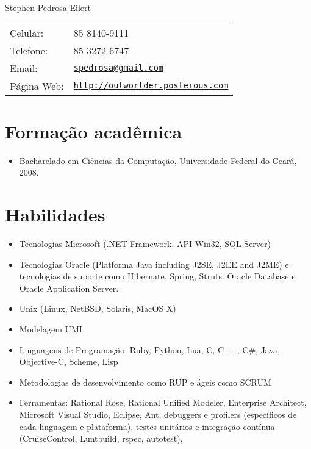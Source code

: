 \documentclass[letterpaper]{article}
\def\name{Stephen Pedrosa Eilert}
\begin{document}
\begin{flushright}

{\huge \name}


\vspace{0.25in}
\begin{minipage}{0.45\linewidth}
  \begin{tabular}{ll}
    Celular: & 85 8140-9111 \\
    Telefone: & 85 3272-6747 \\
    Email: & \href{mailto:spedrosa@gmail.com}{\tt spedrosa@gmail.com} \\
    Página Web: & \href{http://outworlder.posterous.com}{\tt http://outworlder.posterous.com} \\
  \end{tabular}
\end{minipage}
\end{flushright}

\section*{Formação acadêmica}

\begin{itemize}
  \item Bacharelado em Ciências da Computação, Universidade Federal do Ceará, 2008.
\end{itemize}

\section*{Habilidades}
\begin{itemize}
  \item Tecnologias Microsoft (.NET Framework, API Win32, SQL Server)
  \item Tecnologias Oracle (Platforma Java including J2SE, J2EE and J2ME) e tecnologias
    de suporte como Hibernate, Spring, Struts.
    Oracle Database e Oracle Application Server.
  \item Unix (Linux, NetBSD, Solaris, MacOS X)
  \item Modelagem UML
  \item Linguagens de Programação: Ruby, Python, Lua, C, C++, C\#, Java, Objective-C, Scheme, Lisp
  \item Metodologias de desenvolvimento como RUP e ágeis como SCRUM
  \item Ferramentas: Rational Rose, Rational Unified Modeler, Enterprise Architect, Microsoft
Visual Studio, Eclipse, Ant, debuggers e profilers (específicos de cada linguagem e plataforma),
testes unitários e integração contínua (CruiseControl, Luntbuild, rspec, autotest),
\end{itemize}
\end{document}
